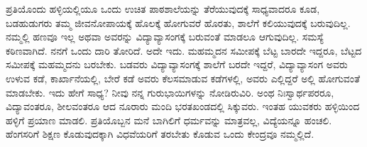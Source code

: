 ಪ್ರತಿಯೊಂದು ಹಳ್ಳಿಯಲ್ಲಿಯೂ ಒಂದು ಉಚಿತ ಪಾಠಶಾಲೆಯನ್ನು ತೆರೆಯುವುದಕ್ಕೆ ಸಾಧ್ಯವಾದರೂ ಕೂಡ, ಬಡಹುಡುಗರು ತಮ್ಮ ಜೀವನೋಪಾಯಕ್ಕೆ ಹೊಲಕ್ಕೆ ಹೋಗುವರೆ ಹೊರತು, ಶಾಲೆಗೆ ಕಲಿಯುವುದಕ್ಕೆ ಬರುವುದಿಲ್ಲ. ನಮ್ಮಲ್ಲಿ ಹಣವೂ ಇಲ್ಲ ಅಥವಾ ಅವರನ್ನು ವಿದ್ಯಾವ್ಯಾಸಂಗಕ್ಕೆ ಬರುವಂತೆ ಮಾಡಲೂ ಆಗುವುದಿಲ್ಲ. ಸಮಸ್ಯೆ ಕಠಿಣವಾಗಿದೆ. ನನಗೆ ಒಂದು ದಾರಿ ತೋರಿದೆ. ಅದೇ ಇದು. ಮಹಮ್ಮದನ ಸಮೀಪಕ್ಕೆ ಬೆಟ್ಟ ಬಾರದೇ ಇದ್ದರೂ, ಬೆಟ್ಟದ ಸಮೀಪಕ್ಕೆ ಮಹಮ್ಮದನು ಬರಬೇಕು. ಬಡವರು ವಿದ್ಯಾವ್ಯಾಸಂಗಕ್ಕೆ ಶಾಲೆಗೆ ಬರದೇ ಇದ್ದರೆ, ವಿದ್ಯಾವ್ಯಾಸಂಗ ಅವರು ಉಳುವ ಕಡೆ, ಕಾರ್ಖಾನೆಯಲ್ಲಿ, ಬೇರೆ ಕಡೆ ಅವರು ಕೆಲಸಮಾಡುವ ಕಡೆಗಳಲ್ಲಿ, ಅವರು ಎಲ್ಲಿದ್ದರೆ ಅಲ್ಲಿ ಹೋಗುವಂತೆ ಮಾಡಬೇಕು. ಇದು ಹೇಗೆ ಸಾಧ್ಯ? ನೀವು ನನ್ನ ಗುರುಭಾಯಿಗಳನ್ನು ನೋಡಿರುವಿರಿ. ಅಂಥ ನಿಃಸ್ವಾರ್ಥಪರರೂ, ವಿದ್ಯಾವಂತರೂ, ಶೀಲವಂತರೂ ಆದ ನೂರಾರು ಮಂದಿ ಭರತಖಂಡದಲ್ಲಿ ಸಿಕ್ಕುವರು. ಇಂತಹ ಯುವಕರು ಹಳ್ಳಿಯಿಂದ ಹಳ್ಳಿಗೆ ಪ್ರಯಾಣ ಮಾಡಲಿ. ಪ್ರತಿಯೊಬ್ಬನ ಮನೆ ಬಾಗಿಲಿಗೆ ಧರ್ಮವನ್ನು ಮಾತ್ರವಲ್ಲ, ವಿದ್ಯೆಯನ್ನೂ ಹಂಚಲಿ. ಹೆಂಗಸರಿಗೆ ಶಿಕ್ಷಣ ಕೊಡುವುದಕ್ಕಾಗಿ ವಿಧವೆಯರಿಗೆ ತರಬೇತು ಕೊಡುವ ಒಂದು ಕೇಂದ್ರವೂ ನಮ್ಮಲ್ಲಿದೆ.

